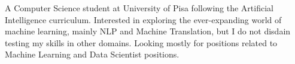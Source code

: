 
\begin{cvparagraph}

A Computer Science student at University of Pisa following the Artificial Intelligence curriculum. Interested in exploring the ever-expanding world of machine learning, mainly NLP and Machine Translation, but I do not disdain testing my skills in other domains. Looking mostly for positions related to Machine Learning and Data Scientist positions.
\end{cvparagraph}
